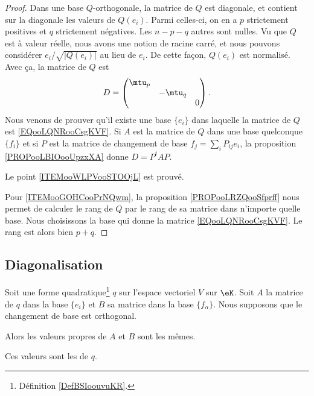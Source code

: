 \begin{proof}
	Dans une base \( Q\)-orthogonale, la matrice de \( Q\) est diagonale, et contient sur la diagonale les valeurs de \( Q(e_i)\). Parmi celles-ci, on en a \( p\) strictement positives et \( q\) strictement négatives. Les \( n-p-q\) autres sont nulles. Vu que \( Q\) est à valeur réelle, nous avons une notion de racine carré, et nous pouvons considérer \( e_i/\sqrt{ | Q(e_i) | }\) au lieu de \( e_i\). De cette façon, \( Q(e_i)\) est normalisé. Avec ça, la matrice de \( Q\) est
	\begin{equation}        \label{EQooLQNRooCsgKVF}
		D=\begin{pmatrix}
			\mtu_p &         &   \\
			       & -\mtu_q &   \\
			       &         & 0
		\end{pmatrix}.
	\end{equation}
	Nous venons de prouver qu'il existe une base \( \{ e_i \}\) dans laquelle la matrice de \( Q\) est \eqref{EQooLQNRooCsgKVF}. Si \( A\) est la matrice de \( Q\) dans une base quelconque \( \{ f_i \}\) et si \( P\) est la matrice de changement de base \( f_j=\sum_iP_{ij}e_i\), la proposition \ref{PROPooLBIOooUpzxXA} donne \(D= P^tAP\).

	Le point \ref{ITEMooWLPVooSTOOjL} est prouvé.

	Pour \ref{ITEMooGOHCooPrNQwm}, la proposition \ref{PROPooLRZQooSfprff} nous permet de calculer le rang de \( Q\) par le rang de sa matrice dans n'importe quelle base. Nous choisissons la base qui donne la matrice \eqref{EQooLQNRooCsgKVF}. Le rang est alors bien \( p+q\).
\end{proof}

\subsection{Diagonalisation}

\begin{lemmaDef}        \label{DEFooGVGGooWQEIET}
	Soit une forme quadratique\footnote{Définition \ref{DefBSIoouvuKR}.} \( q\) sur l'espace vectoriel \( V\) sur \( \eK\). Soit \( A\) la matrice de \( q\) dans la base \( \{ e_i \}\) et \( B\) sa matrice dans la base \( \{f_{\alpha}  \}\). Nous supposons que le changement de base est orthogonal.

	Alors les valeurs propres de \( A\) et \( B\) sont les mêmes.

	Ces valeurs sont les  de \( q\).
\end{lemmaDef}

